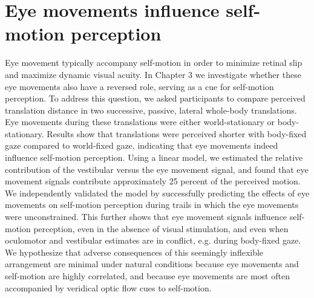 \section{Eye movements influence self-motion perception}
Eye movement typically accompany self-motion in order to minimize retinal slip and maximize dynamic visual acuity. In Chapter 3 we investigate whether these eye movements also have a reversed role, serving as a cue for self-motion perception. To address this question, we asked participants to compare perceived translation distance in two successive, passive, lateral whole-body translations. Eye movements during these translations were either world-stationary or body-stationary. Results show that translations were perceived shorter with body-fixed gaze compared to world-fixed gaze, indicating that eye movements indeed influence self-motion perception. Using a linear model, we estimated the relative contribution of the vestibular versus the eye movement signal, and found that eye movement signals contribute approximately 25 percent of the perceived motion. We independently validated the model by successfully predicting the effects of eye movements on self-motion perception during trails in which the eye movements were unconstrained. This further shows that eye movement signals influence self-motion perception, even in the absence of visual stimulation, and even when oculomotor and vestibular estimates are in conflict, e.g. during body-fixed gaze. We hypothesize that adverse consequences of this seemingly inflexible arrangement are minimal under natural conditions because eye movements and self-motion are highly correlated, and because eye movements are most often accompanied by veridical optic flow cues to self-motion.

